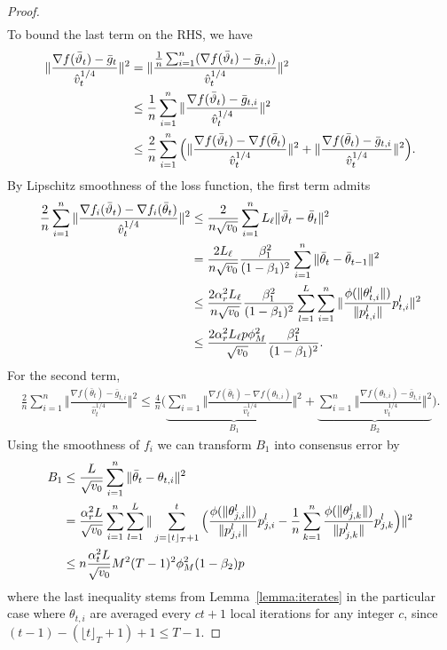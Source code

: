 \documentclass[11pt]{article}
\begin{document}
\begin{proof}
\begin{align}
\end{align}
To bound the last term on the RHS, we have
\begin{align}\notag
    \Vert \frac{\nabla f(\bar\vartheta_t)-\bar g_t }{\hat v_t^{1/4}}\Vert^2&=\Vert \frac{\frac{1}{n}\sum_{i=1}^n (\nabla f(\bar\vartheta_t)-\bar g_{t,i})}{\hat v_t^{1/4}} \Vert^2\\\notag
    &\leq \frac{1}{n}\sum_{i=1}^n\Vert \frac{\nabla f(\bar\vartheta_t)-\bar g_{t,i}}{\hat v_t^{1/4}} \Vert^2\\\notag
    &\leq \frac{2}{n}\sum_{i=1}^n \Big(\Vert \frac{\nabla f(\bar\vartheta_t)-\nabla f(\bar\theta_t)}{\hat v_t^{1/4}} \Vert^2+\Vert \frac{\nabla f(\bar\theta_t)-\bar g_{t,i}}{\hat v_t^{1/4}} \Vert^2  \Big). 
\end{align}
By Lipschitz smoothness of the loss function, the first term admits
\begin{align}\notag
    \frac{2}{n}\sum_{i=1}^n\Vert \frac{\nabla f_i(\bar\vartheta_t)-\nabla f_i(\bar\theta_t)}{\hat v_t^{1/4}} \Vert^2&\leq \frac{2}{n \sqrt{v_0}}\sum_{i=1}^n L_\ell\Vert \bar\vartheta_t-\bar\theta_t\Vert^2  \\\notag
    &=\frac{2L_\ell}{n \sqrt{v_0}}\frac{\beta_1^2}{(1-\beta_1)^2}\sum_{i=1}^n \Vert \bar\theta_t-\bar\theta_{t-1}\Vert ^2\\\notag
    &\leq \frac{2\alpha_r^2 L_\ell }{n \sqrt{v_0}}\frac{\beta_1^2}{(1-\beta_1)^2} \sum_{l=1}^L \sum_{i=1}^n\Vert \frac{\phi(\Vert \theta_{t,i}^l\Vert)}{\Vert p_{t,i}^l\Vert}p_{t,i}^l \Vert^2\\\notag
    &\leq \frac{2\alpha_r^2 L_\ell p\phi_M^2}{ \sqrt{v_0}}\frac{\beta_1^2}{(1-\beta_1)^2}.
\end{align}
For the second term,
\begin{align}\label{eq:inter}
    \frac{2}{n}\sum_{i=1}^n\Vert \frac{\nabla f(\bar\theta_t)-\bar g_{t,i}}{\hat v_t^{1/4}} \Vert^2 \leq \frac{4}{n}\Big( \underbrace{\sum_{i=1}^n \Vert \frac{\nabla f(\bar\theta_t)-\nabla f(\theta_{t,i})}{\hat v_t^{1/4}} \Vert^2}_{B_1} + \underbrace{ \sum_{i=1}^n\Vert \frac{\nabla f(\theta_{t,i})-\bar g_{t,i}}{\hat v_t^{1/4}} \Vert^2}_{B_2} \Big).
\end{align}
Using the smoothness of $f_i$ we can transform $B_1$ into consensus error by
\begin{align}\notag
    B_1&\leq \frac{L}{\sqrt{v_0}}\sum_{i=1}^n \Vert \bar\theta_t - \theta_{t,i}\Vert^2  \label{eqn:B1}\\
    &=\frac{\alpha_r^2 L}{\sqrt{v_0}}\sum_{i=1}^n\sum_{l=1}^L \| \sum_{j=\lfloor t \rfloor_T+1}^t \Big( \frac{\phi(\Vert \theta_{j,i}^l\Vert)}{\Vert p_{j,i}^l\Vert}p_{j,i}^l-\frac{1}{n}\sum_{k=1}^n \frac{\phi(\Vert \theta_{j,k}^l\Vert)}{\Vert p_{j,k}^l\Vert}p_{j,k}^l \Big) \|^2\\\notag
    &\leq n \frac{\alpha_t^2 L}{\sqrt{v_0}} M^2 (T-1)^2 \phi_M^2 (1-\beta_2)p
\end{align}
where the last inequality stems from Lemma~\ref{lemma:iterates} in the particular case where $  \theta_{t,i}$ are averaged every $ct+1$ local iterations for any integer $c$, since $(t-1)-(\lfloor t \rfloor_T+1)+1 \leq T-1$.



\end{proof}
\end{document}
